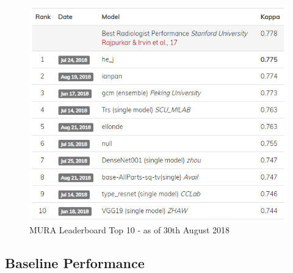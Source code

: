 \documentclass[11pt]{article} %
\theoremstyle{plain}
\theoremstyle{definition}
\begin{document}
\begin{figure}[!ht]
\centering
\includegraphics[scale=0.5]{mura-leaderboard-2018-8-30.PNG}
\caption{MURA Leaderboard Top 10 - as of 30th August 2018}
\label{fig:mura-leaderboard-}
\end{figure}
\FloatBarrier

\newpage
\subsection{Baseline Performance}
\end{document}
